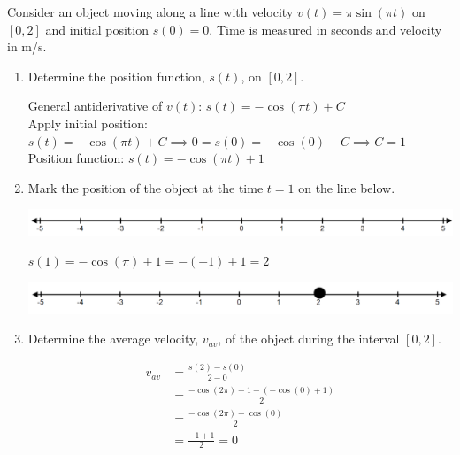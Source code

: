 \documentclass[nooutcomes,handout]{ximera}
\begin{document}
\begin{problem}
	
Consider an object moving along a line with velocity $v(t)=\pi \sin(\pi t)$ on $[0,2]$ and initial position $s(0)=0$.  Time is measured in seconds and velocity in m/s.

\begin{enumerate}
	
	\item Determine the position function, $s(t)$, on $[0,2]$.
	
	\begin{freeResponse}	
		General antiderivative of $v(t)$: $s(t)=-\cos(\pi t)+C$\\
		Apply initial position: $s(t)=-\cos(\pi t)+C \implies 0=s(0)=-\cos(0)+C \implies C=1$\\
		Position function: $s(t)=-\cos(\pi t)+1$
	\end{freeResponse}
	
	\item Mark the position of the object at the time $t=1$ on the line below.
	  \begin{image}
    \includegraphics[scale=.4]{figure3.png}
  \end{image}
		\begin{freeResponse}
		$s(1)=-\cos(\pi)+1=-(-1)+1=2$
		  \begin{image}
    \includegraphics[scale=.4]{figure4.png}
  \end{image}
	\end{freeResponse}
	
	\item Determine the average velocity, $v_{av}$, of the object during the interval $[0,2]$.
	
		\begin{freeResponse}	
	\begin{align*}
	v_{av}&=\frac{s(2)-s(0)}{2-0}\\
	&=\frac{-\cos(2\pi)+1-(-\cos(0)+1)}{2}\\
	&=\frac{-\cos(2\pi)+\cos(0)}{2}\\
	&=\frac{-1+1}{2}=0	
	\end{align*}
	\end{freeResponse}
	

\end{enumerate}
\end{problem}
\end{document}
